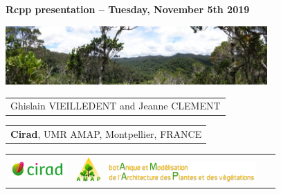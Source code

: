 {
  \begin{frame}
    \begin{center}
      \small{\textbf{Rcpp presentation -- Tuesday, November 5th 2019}}
    \end{center}
    \vspace{-0.5cm}
    \titlepage %
    \vspace{-2.5cm}
    \begin{center}
      \includegraphics[width=10cm]{figs/Banniere.png}
    \end{center}
    \begin{center}

        \begin{tabular}{c}
          Ghislain VIEILLEDENT and 
          Jeanne CLEMENT
        \end{tabular}

      \vspace{0.25cm}

        \begin{tabular}{c}
          \textbf{Cirad}, UMR AMAP, Montpellier, FRANCE 
        \end{tabular}

      \vspace{0.25cm}

      \begin{tabular}{C{2cm}C{2cm}C{3cm}}
        \includegraphics[height=0.7cm]{figs/logo_Cirad.png} &
        \includegraphics[height=1cm]{figs/logo_AMAP.png} 
        \includegraphics[height=0.8cm]{figs/AMAP-titre-long.png} &
        ~
      \end{tabular}

    \end{center}

  \end{frame}
}
\setcounter{framenumber}{0}
